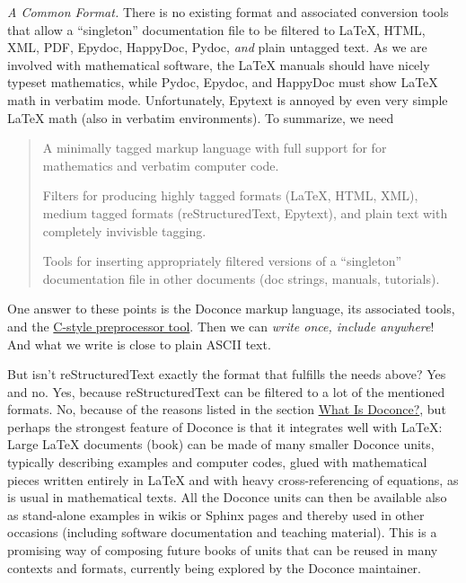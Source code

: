 \documentclass[a4paper,english]{article}
\begin{document}
\emph{A Common Format.} There is no existing format and associated
conversion tools that allow a ``singleton'' documentation file to be
filtered to LaTeX, HTML, XML, PDF, Epydoc, HappyDoc, Pydoc, \emph{and} plain
untagged text. As we are involved with mathematical software, the
LaTeX manuals should have nicely typeset mathematics, while Pydoc,
Epydoc, and HappyDoc must show LaTeX math in verbatim mode.
Unfortunately, Epytext is annoyed by even very simple LaTeX math (also
in verbatim environments). To summarize, we need
%
\begin{quote}
\setcounter{listcnt0}{0}
\begin{list}{.}
{
\setlength{\rightmargin}{\leftmargin}
}

\item A minimally tagged markup language with full support for
for mathematics and verbatim computer code.

\item Filters for producing highly tagged formats (LaTeX, HTML, XML),
medium tagged formats (reStructuredText, Epytext), and plain
text with completely invivisble tagging.

\item Tools for inserting appropriately filtered versions of a ``singleton''
documentation file in other documents (doc strings, manuals, tutorials).
\end{list}

\end{quote}

One answer to these points is the Doconce markup language, its associated
tools, and the \href{http://code.google.com/p/preprocess/}{C-style preprocessor tool}.
Then we can \emph{write once, include anywhere}!
And what we write is close to plain ASCII text.

But isn't reStructuredText exactly the format that fulfills the needs
above? Yes and no. Yes, because reStructuredText can be filtered to a
lot of the mentioned formats. No, because of the reasons listed
in the section \hyperref[id1]{What Is Doconce?}, but perhaps the strongest feature
of Doconce is that it integrates well with LaTeX: Large LaTeX documents (book)
can be made of many smaller Doconce units, typically describing examples
and computer codes, glued with mathematical pieces written entirely
in LaTeX and with heavy cross-referencing of equations, as is usual
in mathematical texts. All the Doconce units can then be available
also as stand-alone examples in wikis or Sphinx pages and thereby used
in other occasions (including software documentation and teaching material).
This is a promising way of composing future books of units that can
be reused in many contexts and formats, currently being explored by
the Doconce maintainer.
\end{document}
